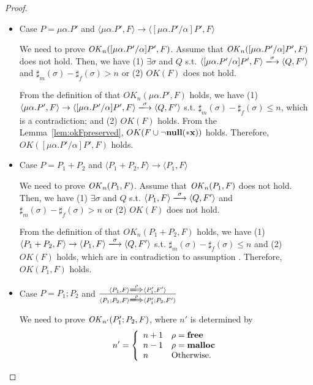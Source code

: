 \begin{proof}
\begin{itemize}
\item Case \( P = \mu\alpha.P' \) and \(  \langle \mu\alpha.P', F \rangle
  \rightarrow \langle [\mu\alpha.P'/\alpha]P', F  \rangle  \)

  We need to prove \(\mathit{OK}_n([\mu\alpha.P'/\alpha]P', F) \).  Assume
  that \(\mathit{OK}_n( [\mu\alpha.P'/\alpha]P', F) \) does not hold. Then, we
  have (1) \( \exists \sigma \) and \(Q\) s.t. \( \langle
  [\mu\alpha.P'/\alpha]P', F \rangle \xlongrightarrow{\sigma} \langle
    Q, F' \rangle \) and \(\sharp_{m}(\sigma) - \sharp_{f}(\sigma) >
    n\) or (2) \( OK(F)\) does not hold.

  From the definition of that \(OK_n(\mu\alpha.P', F)\) holds, we have
  (1) \( \langle \mu\alpha.P', F \rangle \rightarrow \langle
  [\mu\alpha.P'/\alpha]P', F \rangle \xlongrightarrow{\sigma} \langle
  Q, F' \rangle \) s.t. \(\sharp_m(\sigma) - \sharp_f(\sigma) \le n
  \), which is a contradiction; and (2) \(OK(F)\) holds. From the
  Lemma~\ref{lem:okFpreserved}, \(OK(F\cup{\neg\bf{null}(*x)})\)
  holds. Therefore, \(OK([\mu\alpha.P'/\alpha]P', F) \) holds.


\item Case \( P = P_1 + P_2 \) and \(  \langle P_1 + P_2, F \rangle
  \rightarrow \langle P_1, F  \rangle  \)

  We need to prove \(\mathit{OK}_n(P_1, F) \).  Assume
  that \(\mathit{OK}_n(P_1, F) \) does not hold. Then, we
  have (1) \( \exists \sigma \) and \(Q\) s.t. \( \langle
  P_1, F \rangle \xlongrightarrow{\sigma} \langle
    Q, F' \rangle \) and \(\sharp_{m}(\sigma) - \sharp_{f}(\sigma) >
    n\) or (2) \( OK(F)\) does not hold.

  From the definition of that \(OK_n(P_1 + P_2, F)\) holds, we have
  (1) \( \langle P_1 + P_2, F \rangle \rightarrow \langle P_1, F
  \rangle \xlongrightarrow{\sigma} \langle Q, F' \rangle \)
  s.t. \(\sharp_m(\sigma) - \sharp_f(\sigma) \le n \) and (2)
  \(OK(F)\) holds, which are in contradiction to assumption
  . Therefore, \(OK(P_1, F) \) holds.


\item Case \( P = P_1;P_2 \) and \( \frac{ \langle P_1, F \rangle
  \xLongrightarrow{\rho} \langle P_1', F' \rangle} { \langle P_1;P_2,
  F \rangle \xLongrightarrow{\rho} \langle P_1';P_2, F' \rangle } \)

  We need to prove \(\mathit{OK}_{n'}(P_1';P_2, F) \), where \(n'\) is
  determined by 
  \[
   n'=\left\{
   \begin{array}{ll}
     n + 1 & \rho = \mathbf{free}\\
     n - 1 & \rho = \mathbf{malloc}\\
     n & \mbox{Otherwise.}
   \end{array}
   \right.
   \]


\end{itemize}
\end{proof}
